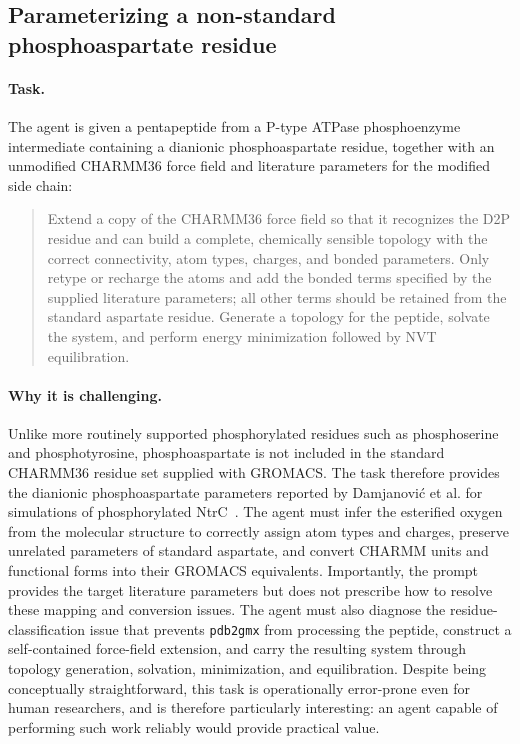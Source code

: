 \documentclass[11pt,a4paper]{article}
\begin{document}
\subsection{Parameterizing a non-standard phosphoaspartate residue}
\label{app:task47}

\paragraph{Task.}
The agent is given a pentapeptide from a P-type ATPase phosphoenzyme intermediate containing a dianionic phosphoaspartate residue, together with an unmodified CHARMM36 force field and literature parameters for the modified side chain:

\begin{quote}
Extend a copy of the CHARMM36 force field so that it recognizes the D2P residue and can build a complete, chemically sensible topology with the correct connectivity, atom types, charges, and bonded parameters. Only retype or recharge the atoms and add the bonded terms specified by the supplied literature parameters; all other terms should be retained from the standard aspartate residue. Generate a topology for the peptide, solvate the system, and perform energy minimization followed by NVT equilibration.
\end{quote}

\paragraph{Why it is challenging.}
Unlike more routinely supported phosphorylated residues such as phosphoserine and phosphotyrosine, phosphoaspartate is not included in the standard CHARMM36 residue set supplied with GROMACS. The task therefore provides the dianionic phosphoaspartate parameters reported by Damjanović et al. for simulations of phosphorylated NtrC~\citep{damjanovic2009self}. The agent must infer the esterified oxygen from the molecular structure to correctly assign atom types and charges, preserve unrelated parameters of standard aspartate, and convert CHARMM units and functional forms into their GROMACS equivalents. Importantly, the prompt provides the target literature parameters but does not prescribe how to resolve these mapping and conversion issues. The agent must also diagnose the residue-classification issue that prevents \texttt{pdb2gmx} from processing the peptide, construct a self-contained force-field extension, and carry the resulting system through topology generation, solvation, minimization, and equilibration. Despite being conceptually straightforward, this task is operationally error-prone even for human researchers, and is therefore particularly interesting: an agent capable of performing such work reliably would provide practical value.
\end{document}
